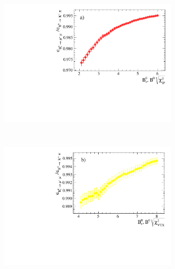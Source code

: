 \begin{figure}[htbp]
    \centering
    \begin{subfigure}[b]{0.45\textwidth}
        \includegraphics[width=\textwidth]{./Figs/Selection/Bs2MuMu_KPi_IP.pdf}
        \label{fig:IPS_ratioKPi}
    \end{subfigure}
    ~ %
    \begin{subfigure}[b]{0.45\textwidth}
        \includegraphics[width=\textwidth]{./Figs/Selection/BSMuMu_KPi_vertex.pdf}
        \label{fig:CHI2_ratioKPi}
    \end{subfigure}
    ~ %


\end{figure}
